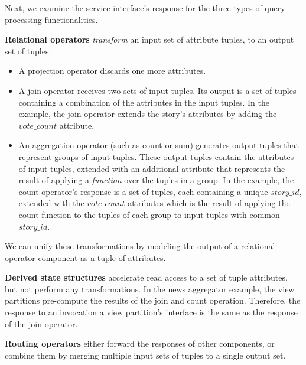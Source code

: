 Next, we examine the service interface's response for the three types of query processing functionalities.

  \medskip
  \noindent
  \textbf{Relational operators} \textit{transform} an input set of attribute tuples, to an output set of tuples:
    \begin{itemize}
    \item A projection operator discards one more attributes.
    \item A join operator receives two sets of input tuples.
    Its output is a set of tuples containing a combination of the attributes in the input tuples.
    In the example, the join operator extends the story's attributes by adding the $vote\_count$ attribute.
    \item An aggregation operator (such as count or sum) generates output tuples that represent groups of input tuples.
    These output tuples contain the attributes of input tuples, extended with an additional attribute that represents the
    result of applying a \textit{function} over the tuples in a group.
    In the example, the count operator's response is a set of tuples,
    each containing a unique $story\_id$, extended with the $vote\_count$ attributes
    which is the result of applying the count function to the tuples of each group to input tuples with common $story\_id$.
    \end{itemize}
  We can unify these transformations by modeling the output of a relational operator component as a tuple of attributes.

  \medskip
  \noindent
  \textbf{Derived state structures} accelerate read access to a set of tuple attributes,
  but not perform any transformations.
  In the news aggregator example, the view partitions pre-compute the results of the join and count operation.
  Therefore, the response to an invocation a view partition's interface is the same as the response of the join operator.

  \medskip
  \noindent
  \textbf{Routing operators} either forward the responses of other components, or combine them by merging
  multiple input sets of tuples to a single output set.

